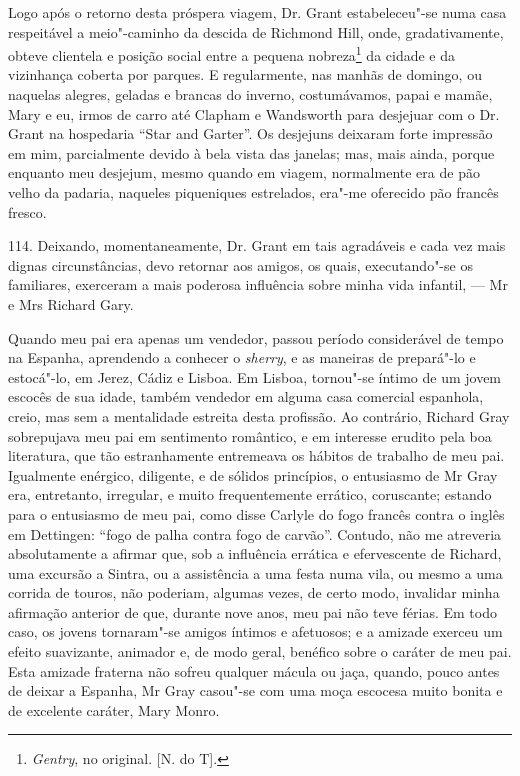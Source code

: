 Logo após o retorno desta próspera viagem, Dr. Grant estabeleceu"-se numa
casa respeitável a meio"-caminho da descida de Richmond Hill, onde,
gradativamente, obteve clientela e posição social entre a pequena
nobreza\footnote{\emph{Gentry}, no original. {[}N. do T{]}.} da cidade e
da vizinhança coberta por parques. E regularmente, nas manhãs de
domingo, ou naquelas alegres, geladas e brancas do inverno,
costumávamos, papai e mamãe, Mary e eu, irmos de carro até Clapham e
Wandsworth para desjejuar com o Dr. Grant na hospedaria ``Star and
Garter''. Os desjejuns deixaram forte impressão em mim, parcialmente
devido à bela vista das janelas; mas, mais ainda, porque enquanto meu
desjejum, mesmo quando em viagem, normalmente era de pão velho da
padaria, naqueles piqueniques estrelados, era"-me oferecido pão francês
fresco.

114. Deixando, momentaneamente, Dr. Grant em tais agradáveis e cada vez
mais dignas circunstâncias, devo retornar aos amigos, os quais,
executando"-se os familiares, exerceram a mais poderosa influência sobre
minha vida infantil, --- Mr e Mrs Richard Gary.

Quando meu pai era apenas um vendedor, passou período considerável de
tempo na Espanha, aprendendo a conhecer o \emph{sherry}, e as maneiras
de prepará"-lo e estocá"-lo, em Jerez, Cádiz e Lisboa. Em Lisboa,
tornou"-se íntimo de um jovem escocês de sua idade, também vendedor em
alguma casa comercial espanhola, creio, mas sem a mentalidade estreita
desta profissão. Ao contrário, Richard Gray sobrepujava meu pai em
sentimento romântico, e em interesse erudito pela boa literatura, que
tão estranhamente entremeava os hábitos de trabalho de meu pai.
Igualmente enérgico, diligente, e de sólidos princípios, o entusiasmo de
Mr Gray era, entretanto, irregular, e muito frequentemente errático,
coruscante; estando para o entusiasmo de meu pai, como disse Carlyle do
fogo francês contra o inglês em Dettingen: ``fogo de palha contra fogo
de carvão''. Contudo, não me atreveria absolutamente a afirmar que, sob
a influência errática e efervescente de Richard, uma excursão a Sintra,
ou a assistência a uma festa numa vila, ou mesmo a uma corrida de
touros, não poderiam, algumas vezes, de certo modo, invalidar minha
afirmação anterior de que, durante nove anos, meu pai não teve férias.
Em todo caso, os jovens tornaram"-se amigos íntimos e afetuosos; e a
amizade exerceu um efeito suavizante, animador e, de modo geral,
benéfico sobre o caráter de meu pai. Esta amizade fraterna não sofreu
qualquer mácula ou jaça, quando, pouco antes de deixar a Espanha, Mr
Gray casou"-se com uma moça escocesa muito bonita e de excelente caráter,
Mary Monro.

